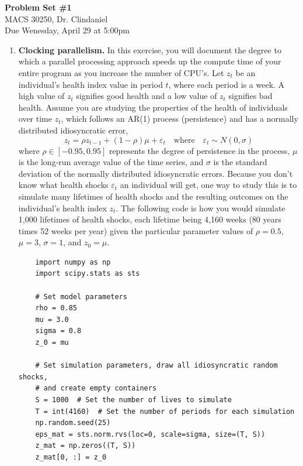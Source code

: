 \documentclass[letterpaper,12pt]{article}
\theoremstyle{definition}
\newcommand\ve{\varepsilon}
\begin{document}
\begin{flushleft}
  \textbf{\large{Problem Set \#1}} \\
  MACS 30250, Dr. Clindaniel \\
  Due Wenesday, April 29 at 5:00pm
\end{flushleft}

\vspace{5mm}

\begin{enumerate}
  \item \textbf{Clocking parallelism.} In this exercise, you will document the degree to which a parallel processing approach speeds up the compute time of your entire program as you increase the number of CPU's. Let $z_t$ be an individual's health index value in period $t$, where each period is a week. A high value of $z_t$ signifies good health and a low value of $z_t$ signifies bad health. Assume you are studying the properties of the health of individuals over time $z_t$, which follows an AR(1) process (persistence) and has a normally distributed idiosyncratic error,
  \begin{equation*}
    z_{t} = \rho z_{t-1} + (1-\rho)\mu + \ve_t \quad\text{where}\quad \ve_t\sim N(0,\sigma)
  \end{equation*}
  where $\rho\in[-0.95,0.95]$ represents the degree of persistence in the process, $\mu$ is the long-run average value of the time series, and $\sigma$ is the standard deviation of the normally distributed idiosyncratic errors. Because you don't know what health shocks $\ve_t$ an individual will get, one way to study this is to simulate many lifetimes of health shocks and the resulting outcomes on the individual's health index $z_t$. The following code is how you would simulate 1,000 lifetimes of health shocks, each lifetime being 4,160 weeks (80 years times 52 weeks per year) given the particular parameter values of $\rho=0.5$, $\mu=3$, $\sigma=1$, and $z_0=\mu$.
  \vspace{3mm}
  \begin{lstlisting}
    import numpy as np
    import scipy.stats as sts

    # Set model parameters
    rho = 0.85
    mu = 3.0
    sigma = 0.8
    z_0 = mu

    # Set simulation parameters, draw all idiosyncratic random shocks,
    # and create empty containers
    S = 1000  # Set the number of lives to simulate
    T = int(4160)  # Set the number of periods for each simulation
    np.random.seed(25)
    eps_mat = sts.norm.rvs(loc=0, scale=sigma, size=(T, S))
    z_mat = np.zeros((T, S))
    z_mat[0, :] = z_0


\end{lstlisting}
\end{enumerate}
\end{document}
